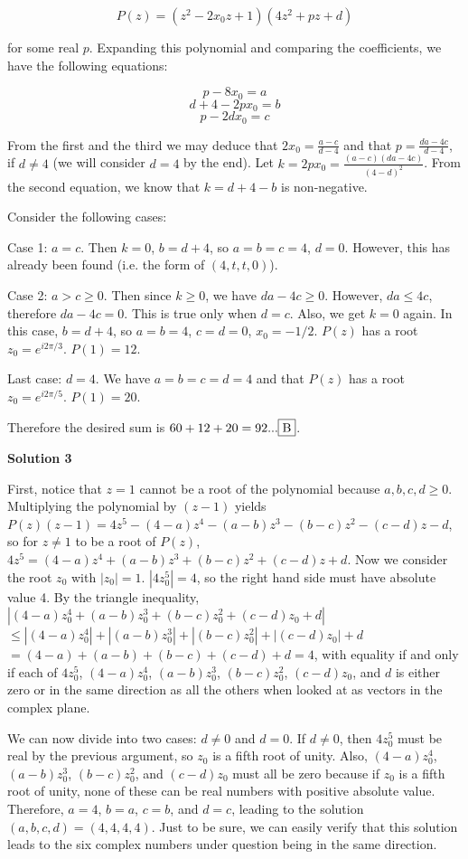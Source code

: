 \begin{enumerate}
 
 \[P(z) = (z^2-2x_0 z + 1)(4z^2 + pz + d)\]

 for some real $p$. Expanding this polynomial and comparing the coefficients, we have the following equations:

 
 \[p-8x_0 = a\]
 \[d+4-2px_0 = b\]
 \[p-2dx_0 = c\]

 From the first and the third we may deduce that $2x_0 = \frac{a-c}{d-4}$ and that $p=\frac{da-4c}{d-4}$, if $d\neq 4$ (we will consider $d=4$ by the end). Let $k=2px_0=\frac{(a-c)(da-4c)}{(4-d)^2}$. From the second equation, we know that $k=d+4-b$ is non-negative.

 Consider the following cases:

 Case 1: $a=c$. Then $k=0$, $b=d+4$, so $a=b=c=4$, $d=0$. However, this has already been found (i.e. the form of $(4,t,t,0)$).

 Case 2: $a>c\geq 0$. Then since $k\geq 0$, we have $da-4c\geq 0$. However, $da \leq 4c$, therefore $da-4c=0$. This is true only when $d=c$. Also, we get $k=0$ again. In this case, $b=d+4$, so $a=b=4$, $c=d=0$, $x_0=-1/2$. $P(z)$ has a root $z_0=e^{i2\pi/3}$. $P(1)=12$.

 Last case: $d=4$. We have $a=b=c=d=4$ and that $P(z)$ has a root $z_0=e^{i2\pi/5}$. $P(1)=20$.

 Therefore the desired sum is $60+12+20=92 ...\framebox{B}$.

 



\textbf{Solution 3}

First, notice that $z=1$ cannot be a root of the polynomial because $a,b,c,d \geq 0$. Multiplying the polynomial by $(z-1)$ yields $P(z)(z-1) = 4z^5-(4-a)z^4-(a-b)z^3-(b-c)z^2-(c-d)z-d$, so for $z \neq 1$ to be a root of $P(z)$, $4z^5 = (4-a)z^4+(a-b)z^3+(b-c)z^2+(c-d)z+d$. Now we consider the root $z_0$ with $|z_0|=1$. $|4z_0^5| = 4$, so the right hand side must have absolute value 4. By the triangle inequality, $|(4-a)z_0^4+(a-b)z_0^3+(b-c)z_0^2+(c-d)z_0+d|$ $\leq |(4-a)z_0^4|+|(a-b)z_0^3| + |(b-c)z_0^2| + |(c-d)z_0|+d$ $= (4-a)+(a-b)+(b-c)+(c-d)+d=4$, with equality if and only if each of $4z_0^5$, $(4-a)z_0^4$, $(a-b)z_0^3$, $(b-c)z_0^2$, $(c-d)z_0$, and $d$ is either zero or in the same direction as all the others when looked at as vectors in the complex plane. 

 We can now divide into two cases: $d \neq 0$ and $d=0$. If $d \neq 0$, then $4z_0^5$ must be real by the previous argument, so $z_0$ is a fifth root of unity. Also, $(4-a)z_0^4$, $(a-b)z_0^3$, $(b-c)z_0^2$, and $(c-d)z_0$ must all be zero because if $z_0$ is a fifth root of unity, none of these can be real numbers with positive absolute value. Therefore, $a=4$, $b=a$, $c=b$, and $d=c$, leading to the solution $(a,b,c,d)=(4,4,4,4)$. Just to be sure, we can easily verify that this solution leads to the six complex numbers under question being in the same direction.


\end{enumerate}

